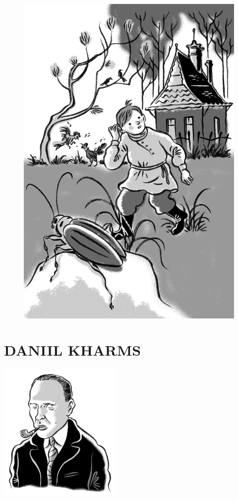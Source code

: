 \begin{figure}%
\vspace*{-2cm}
\hspace*{-2.3cm}\includegraphics{./imgs/cena14.jpg}
\end{figure}



\part[DANIIL KHARMS]{DANIIL KHARMS }

\pagebreak
\thispagestyle{empty}
\mbox{}
\vfill
\begin{center}
\includegraphics[width=6cm]{./imgs/autor12.jpg}
\end{center}


